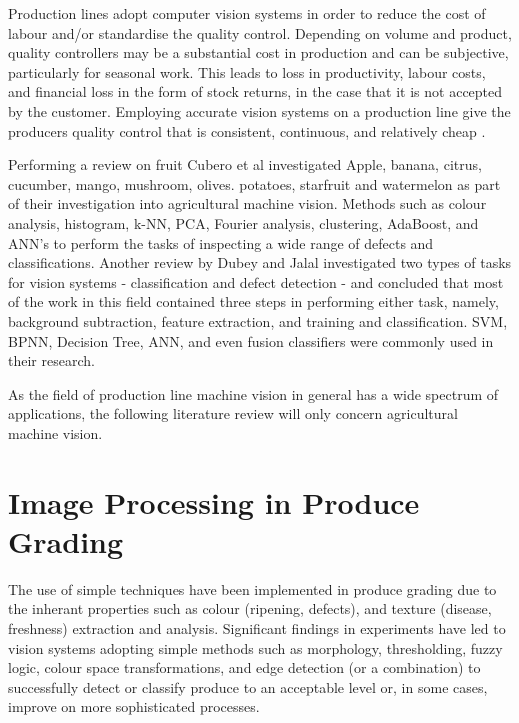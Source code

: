 \documentclass[fleqn,twoside,12pt]{report}
\begin{document}
Production lines adopt computer vision systems in order to reduce the cost of labour and/or standardise the quality control. Depending on volume and product, quality controllers may be a substantial cost in production and can be subjective, particularly for seasonal work. This leads to loss in productivity, labour costs, and financial loss in the form of stock returns, in the case that it is not accepted by the customer. Employing accurate vision systems on a production line give the producers quality control that is consistent, continuous, and relatively cheap \cite{heleno,chen}. 

Performing a review on fruit Cubero et al \cite{cubero} investigated Apple, banana, citrus, cucumber, mango, mushroom, olives. potatoes, starfruit and watermelon as part of their investigation into agricultural machine vision. Methods such as colour analysis, histogram, k-NN, PCA, Fourier analysis, clustering, AdaBoost, and ANN's to perform the tasks of inspecting a wide range of defects and classifications. Another review by Dubey and Jalal \cite{dubey} investigated two types of tasks for vision systems - classification and defect detection - and concluded that most of the work in this field contained three steps in performing either task, namely, background subtraction, feature extraction, and training and classification. SVM, BPNN, Decision Tree, ANN, and even fusion classifiers were commonly used in their research.

As the field of production line machine vision in general has a wide spectrum of applications, the following literature review will only concern agricultural machine vision. 


\section{Image Processing in Produce Grading}

 
The use of simple techniques have been implemented in produce grading due to the inherant properties such as colour (ripening, defects), and texture (disease, freshness) extraction and analysis. Significant findings in experiments have led to vision systems adopting simple methods such as morphology, thresholding, fuzzy logic, colour space transformations, and edge detection (or a combination) to successfully detect or classify produce to an acceptable level or, in some cases, improve on more sophisticated processes.
\end{document}
